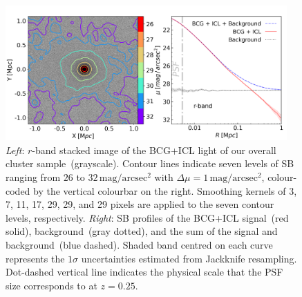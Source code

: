 \documentclass[fleqn,usenatbib]{mnras}
\newcommand{\sbmag}{\mathrm{mag}/\mathrm{arcsec}^{2}}
\begin{document}
\begin{figure}
    \centering\includegraphics[width=0.96\textwidth]{fig/mass_bin_r_band_BG_sub_2D.pdf}
    \caption{{\it Left}: $r$-band stacked image of the BCG+ICL light of our
    overall cluster sample~(grayscale). Contour lines indicate seven levels
    of SB ranging from $26$ to $32\,\sbmag$ with $\Delta\mu{=}1\,\sbmag$,
    colour-coded by the vertical colourbar on the right. Smoothing kernels
    of 3, 7, 11, 17, 29, 29, and 29 pixels are applied to the seven contour
    levels, respectively. {\it Right}: SB profiles of the BCG+ICL
    signal~(red solid), background~(gray dotted), and the sum of the signal
    and background~(blue dashed). Shaded band centred on each curve
    represents the $1\sigma$ uncertainties estimated from Jackknife
    resampling. Dot-dashed vertical line indicates the physical scale that
    the PSF size corresponds to at $z{=}0.25$.\label{fig:2D_all} }
\end{figure}
\end{document}
